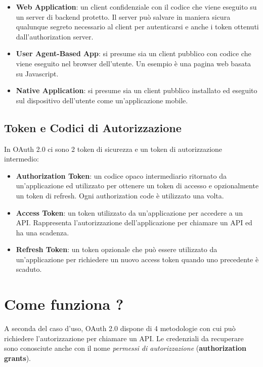 \begin{itemize}
    \item \textbf{Web Application}: un client confidenziale con il codice che viene
          eseguito su un server di backend protetto. Il server può salvare in maniera
          sicura qualunque segreto necessario al client per autenticarsi e anche i
          token ottenuti dall'authorization server.
    \item \textbf{User Agent-Based App}: si presume sia un client pubblico con codice
          che viene eseguito nel browser dell'utente. Un esempio è una pagina web
          basata su Javascript.
    \item \textbf{Native Application}: si presume sia un client pubblico installato
          ed eseguito sul dispositivo dell'utente come un'applicazione mobile.
\end{itemize}

\subsection{Token e Codici di Autorizzazione}

In OAuth 2.0 ci sono 2 token di sicurezza e un token di autorizzazione intermedio:

\begin{itemize}
    \item \textbf{Authorization Token}: un codice opaco intermediario ritornato
          da un'applicazione ed utilizzato per ottenere un token di accesso e
          opzionalmente un token di refresh. Ogni authorization code è utilizzato
          una volta.
    \item \textbf{Access Token}: un token utilizzato da un'applicazione per accedere
          a un API. Rappresenta l'autorizzazione dell'applicazione per chiamare un API
          ed ha una scadenza.
    \item \textbf{Refresh Token}: un token opzionale che può essere utilizzato da
          un'applicazione per richiedere un nuovo access token quando uno precedente
          è scaduto.
\end{itemize}

\section{Come funziona ?}

A seconda del caso d'uso, OAuth 2.0 dispone di 4 metodologie con cui può richiedere
l'autorizzazione per chiamare un API. Le credenziali da recuperare sono conosciute
anche con il nome \textit{permessi di autorizzazione} (\textbf{authorization grants}).

